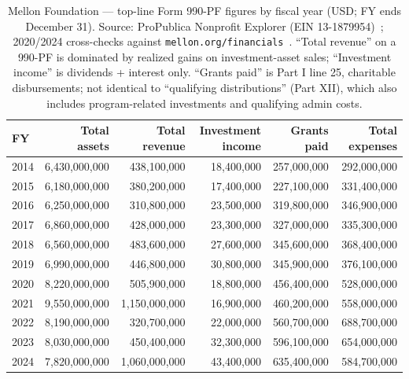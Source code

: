 \documentclass[10pt,letterpaper,twocolumn]{article}
\begin{document}
\begin{table}[t]
\footnotesize
\centering
\setlength{\tabcolsep}{4pt}
\begin{tabularx}{\textwidth}{Xrrrrr}
\toprule
\textbf{FY} & \textbf{Total assets} & \textbf{Total revenue} & \textbf{Investment income} & \textbf{Grants paid} & \textbf{Total expenses} \\
\midrule
2014 & 6{,}430{,}000{,}000 & 438{,}100{,}000 & 18{,}400{,}000 & 257{,}000{,}000 & 292{,}000{,}000 \\
2015 & 6{,}180{,}000{,}000 & 380{,}200{,}000 & 17{,}400{,}000 & 227{,}100{,}000 & 331{,}400{,}000 \\
2016 & 6{,}250{,}000{,}000 & 310{,}800{,}000 & 23{,}500{,}000 & 319{,}800{,}000 & 346{,}900{,}000 \\
2017 & 6{,}860{,}000{,}000 & 428{,}000{,}000 & 23{,}300{,}000 & 327{,}000{,}000 & 335{,}300{,}000 \\
2018 & 6{,}560{,}000{,}000 & 483{,}600{,}000 & 27{,}600{,}000 & 345{,}600{,}000 & 368{,}400{,}000 \\
2019 & 6{,}990{,}000{,}000 & 446{,}800{,}000 & 30{,}800{,}000 & 345{,}900{,}000 & 376{,}100{,}000 \\
2020 & 8{,}220{,}000{,}000 & 505{,}900{,}000 & 18{,}800{,}000 & 456{,}400{,}000 & 528{,}000{,}000 \\
2021 & 9{,}550{,}000{,}000 & 1{,}150{,}000{,}000 & 16{,}900{,}000 & 460{,}200{,}000 & 558{,}000{,}000 \\
2022 & 8{,}190{,}000{,}000 & 320{,}700{,}000 & 22{,}000{,}000 & 560{,}700{,}000 & 688{,}700{,}000 \\
2023 & 8{,}030{,}000{,}000 & 450{,}400{,}000 & 32{,}300{,}000 & 596{,}100{,}000 & 654{,}000{,}000 \\
2024 & 7{,}820{,}000{,}000 & 1{,}060{,}000{,}000 & 43{,}400{,}000 & 635{,}400{,}000 & 584{,}700{,}000 \\
\bottomrule
\end{tabularx}
\caption{Mellon Foundation --- top-line Form 990-PF figures by fiscal year (USD; FY ends December 31). Source: ProPublica Nonprofit Explorer (EIN 13-1879954)~\citep{propublicamellon}; 2020/2024 cross-checks against \texttt{mellon.org/financials}~\citep{mellonfinancials}. ``Total revenue'' on a 990-PF is dominated by realized gains on investment-asset sales; ``Investment income'' is dividends + interest only. ``Grants paid'' is Part I line 25, charitable disbursements; not identical to ``qualifying distributions'' (Part XII), which also includes program-related investments and qualifying admin costs.}
\label{tab:financials}
\end{table}
\end{document}
